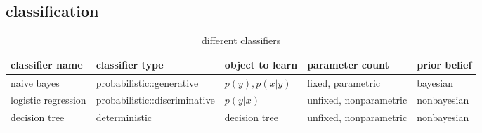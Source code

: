 \documentclass[12pt]{article}
\begin{document}
\begin{multicols}{2}
  \section{classification}
\end{multicols}{}
\begin{table}[htb]
  \centering
  \begin{tabularx}{\textwidth}{|l|l|X|X|l|} \hline
    classifier name & classifier type & object to learn & parameter count & prior belief \\ \hline
    naive bayes & probabilistic::generative & $p(y), p(x|y)$ & fixed, parametric & bayesian  \\ \hline
    logistic regression & probabilistic::discriminative & $p(y|x)$ & unfixed, nonparametric & nonbayesian \\ \hline
    decision tree & deterministic & decision tree & unfixed, nonparametric & nonbayesian \\ \hline
  \end{tabularx}
  \caption{different classifiers}
\end{table}
\end{document}
